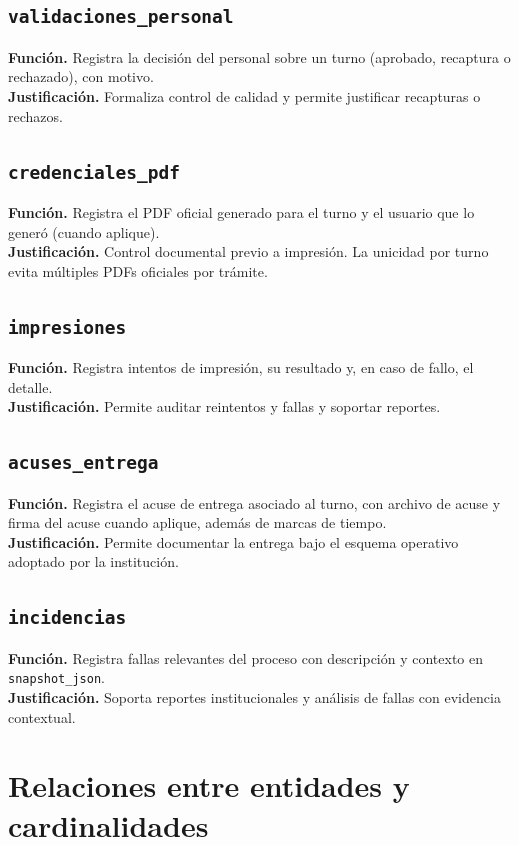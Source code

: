 \documentclass[12pt,a4paper]{article}
\begin{document}
\subsection{\texttt{validaciones\_personal}}
\textbf{Función.} Registra la decisión del personal sobre un turno (aprobado, recaptura o rechazado), con motivo.\\
\textbf{Justificación.} Formaliza control de calidad y permite justificar recapturas o rechazos.

\subsection{\texttt{credenciales\_pdf}}
\textbf{Función.} Registra el PDF oficial generado para el turno y el usuario que lo generó (cuando aplique).\\
\textbf{Justificación.} Control documental previo a impresión. La unicidad por turno evita múltiples PDFs oficiales por trámite.

\subsection{\texttt{impresiones}}
\textbf{Función.} Registra intentos de impresión, su resultado y, en caso de fallo, el detalle.\\
\textbf{Justificación.} Permite auditar reintentos y fallas y soportar reportes.

\subsection{\texttt{acuses\_entrega}}
\textbf{Función.} Registra el acuse de entrega asociado al turno, con archivo de acuse y firma del acuse cuando aplique, además de marcas de tiempo.\\
\textbf{Justificación.} Permite documentar la entrega bajo el esquema operativo adoptado por la institución.

\subsection{\texttt{incidencias}}
\textbf{Función.} Registra fallas relevantes del proceso con descripción y contexto en \texttt{snapshot\_json}.\\
\textbf{Justificación.} Soporta reportes institucionales y análisis de fallas con evidencia contextual.

\section{Relaciones entre entidades y cardinalidades}
\end{document}
